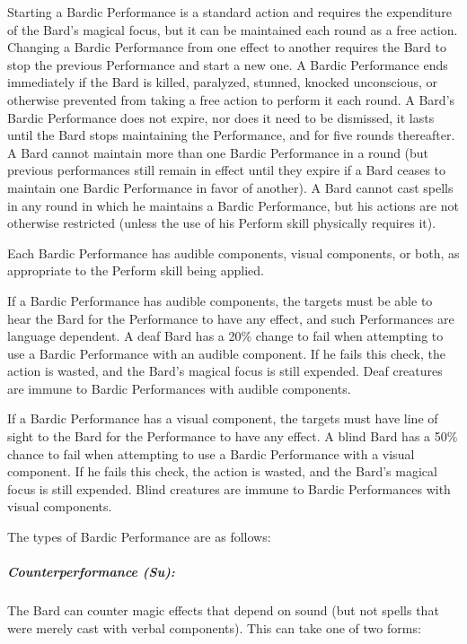 
Starting a Bardic Performance is a standard action and requires the expenditure of the Bard's magical focus, but it can be maintained each round as a free action. 
Changing a Bardic Performance from one effect to another requires the Bard to stop the previous Performance and start a new one. 
A Bardic Performance ends immediately if the Bard is killed, paralyzed, stunned, knocked unconscious, or otherwise prevented from taking a free action to perform it each round. 
A Bard's Bardic Performance does not expire, nor does it need to be dismissed, it lasts until the Bard stops maintaining the Performance, and for five rounds thereafter. 
A Bard cannot maintain more than one Bardic Performance in a round (but previous performances still remain in effect until they expire if a Bard ceases to maintain one Bardic Performance in favor of another). 
A Bard cannot cast spells in any round in which he maintains a Bardic Performance, but his actions are not otherwise restricted (unless the use of his Perform skill physically requires it).

Each Bardic Performance has audible components, visual components, or both, as appropriate to the Perform skill being applied.

If a Bardic Performance has audible components, the targets must be able to hear the Bard for the Performance to have any effect, and such Performances are language dependent. A deaf Bard has a 20\% change to fail when attempting to use a Bardic Performance with an audible component. If he fails this check, the action is wasted, and the Bard's magical focus is still expended. Deaf creatures are immune to Bardic Performances with audible components.

If a Bardic Performance has a visual component, the targets must have line of sight to the Bard for the Performance to have any effect. A blind Bard has a 50\% chance to fail when attempting to use a Bardic Performance with a visual component. If he fails this check, the action is wasted, and the Bard's magical focus is still expended. Blind creatures are immune to Bardic Performances with visual components.

The types of Bardic Performance are as follows:
\subparagraph{Counterperformance (Su):}
The Bard can counter magic effects that depend on sound (but not spells that were merely cast with verbal components). 
This can take one of two forms:
 
